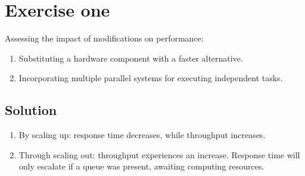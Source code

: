 \section{Exercise one}

Assessing the impact of modifications on performance:
\begin{enumerate}
    \item Substituting a hardware component with a faster alternative.
    \item Incorporating multiple parallel systems for executing independent tasks.
\end{enumerate}

\subsection*{Solution}
\begin{enumerate}
    \item By scaling up: response time decreases, while throughput increases.
    \item Through scaling out: throughput experiences an increase.
        Response time will only escalate if a queue was present, awaiting computing resources.
\end{enumerate}